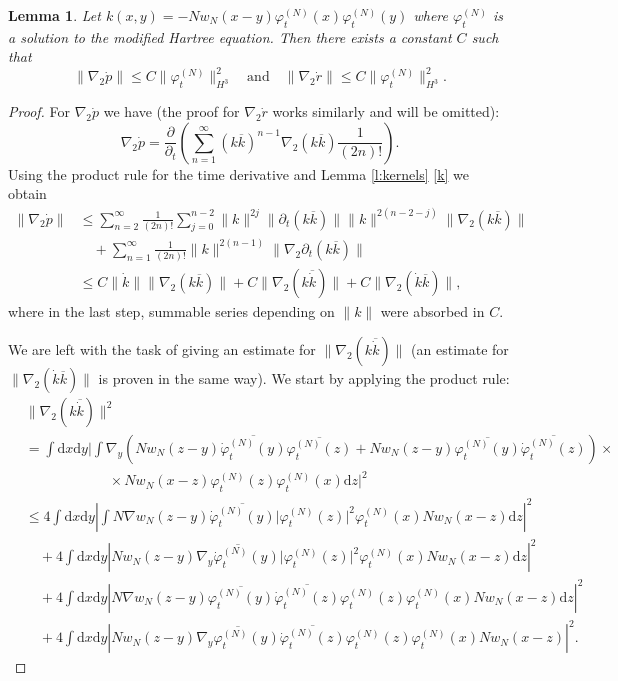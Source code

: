 \documentclass[11pt,a4paper,draft,DIV11]{scrartcl}	%
\newtheorem{lem}[thm]{Lemma}
\newcommand{\di}{\textrm{d}}		%
\newcommand{\cc}[1]{\overline{#1}}	%
\newcommand{\norm}[1]{\lVert#1\rVert}	%
\newcommand{\ph}{\varphi_t^{(N)}}	%
\newcommand{\phdot}{\dot{\varphi}_t^{(N)}}	%
\newcommand{\gradone}{\nabla_2}
\newcommand{\bd}{\begin{displaymath}}			%
\newcommand{\ed}{\end{displaymath}}
\begin{document}
\begin{lem}
\label{lem:dottedests3}
Let $k(x,y) = -N w_N(x-y) \ph(x)\ph(y)$ where $\ph$ is a solution to the modified Hartree equation. Then there exists a constant $C$ such that
\bd
\norm{\gradone \dot p} \leq C \norm{\ph}_{H^3}^2 \quad \mbox{and} \quad \norm{\gradone \dot r} \leq C \norm{\ph}_{H^3}^2.
\ed
\end{lem}
\begin{proof}
For $\gradone \dot p$ we have (the proof for $\gradone \dot r$ works similarly and will be omitted):
\bd
\gradone \dot p = \frac{\partial}{\partial_t} \left( \sum_{n=1}^\infty (k \cc k)^{n-1} \gradone(k \cc k) \frac{1}{(2n)!} \right).
\ed
Using the product rule for the time derivative and Lemma \ref{l:kernels} \ref{k} we obtain
\begin{align*}
\norm{\gradone \dot p} & \leq \sum_{n=2}^\infty \frac{1}{(2n)!} \sum_{j=0}^{n-2} \norm{k}^{2j} \norm{\partial_t(k \cc k)} \norm{k}^{2(n-2-j)} \norm{\gradone (k \cc k)} \\
& \quad + \sum_{n=1}^\infty \frac{1}{(2n)!} \norm{k}^{2(n-1)} \norm{\gradone \partial_t (k \cc k)} \\
& \leq C \norm{\dot k} \norm{\gradone(k \cc k)} + C \norm{\gradone(k \cc{\dot k})} + C \norm{\gradone (\dot k \cc k)},
\end{align*}
where in the last step, summable series depending on $\norm{k}$ were absorbed in $C$.

We are left with the task of giving an estimate for $\norm{\gradone(k \cc{\dot k})}$ (an estimate for $\norm{\gradone (\dot k \cc k)}$ is proven in the same way). We start by applying the product rule:
\begin{align}
& \norm{\gradone(k \cc{\dot k})}^2 \nonumber \\
& = \int \di x \di y \bigg\lvert \int \nabla_y\left( N w_N(z-y) \cc{\phdot(y)} \cc{\ph(z)} + N w_N(z-y) \cc{\ph(y)} \cc{\phdot(z)} \right) \times \nonumber \\
& \qquad\qquad\qquad \times N w_N(x-z) {\ph(z)} {\ph(x)} \di z \bigg\rvert^2 \nonumber \\
& \leq 4 \int \di x \di y \left\lvert \int N \nabla w_N(z-y) \cc{\phdot(y)} \lvert\ph(z)\rvert^2 {\ph(x)} N w_N(x-z) \di z \right\rvert^2 \label{eq:kk1} \\
& \quad + 4 \int \di x \di y \left\lvert N w_N(z-y) \cc{\nabla_y \phdot(y)} \lvert \ph(z)\rvert^2 {\ph(x)} N w_N(x-z) \di z \right\rvert^2 \label{eq:kk2}\\
& \quad + 4 \int \di x \di y \left\lvert N \nabla w_N(z-y) \cc{\ph(y)} \cc{\phdot(z)} {\ph(z)} {\ph(x)} N w_N(x-z) \di z \right\rvert^2 \label{eq:kk3}\\
& \quad + 4 \int \di x \di y \left\lvert N w_N(z-y) \cc{\nabla_y \ph(y)} \cc{\phdot(z)} {\ph(z)} {\ph(x)} N w_N(x-z) \right\rvert^2. \label{eq:kk4}
\end{align}


\end{proof}
\end{document}

